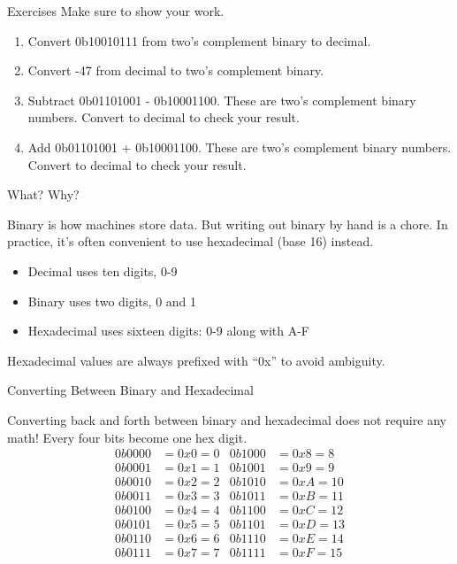 \begin{frame}{Exercises}
    Make sure to show your work.
    \begin{enumerate}
        \item Convert 0b10010111 from two's complement binary to decimal.
        \item Convert -47 from decimal to two's complement binary.
        \item Subtract 0b01101001 - 0b10001100. These are two's complement binary numbers.
              Convert to decimal to check your result.
        \item Add 0b01101001 + 0b10001100. These are two's complement binary numbers. Convert
              to decimal to check your result.
    \end{enumerate}
\end{frame}


\begin{frame}{What? Why?}

    Binary is how machines store data. But writing out binary by hand is a chore.
    In practice, it's often convenient to use hexadecimal (base 16) instead.

    \begin{itemize}
        \item Decimal uses ten digits, 0-9
        \item Binary uses two digits, 0 and 1
        \item Hexadecimal uses sixteen digits: 0-9 along with A-F
    \end{itemize}
    Hexadecimal values are always prefixed with ``0x'' to avoid ambiguity.
\end{frame}

\begin{frame}{Converting Between Binary and Hexadecimal}

    Converting back and forth between binary and hexadecimal does not require any
    math! Every four bits become one hex digit.
    \begin{align*}
        0b0000 & = 0x0 = 0 & 0b1000 & = 0x8 = 8  \\
        0b0001 & = 0x1 = 1 & 0b1001 & = 0x9 = 9  \\
        0b0010 & = 0x2 = 2 & 0b1010 & = 0xA = 10 \\
        0b0011 & = 0x3 = 3 & 0b1011 & = 0xB = 11 \\
        0b0100 & = 0x4 = 4 & 0b1100 & = 0xC = 12 \\
        0b0101 & = 0x5 = 5 & 0b1101 & = 0xD = 13 \\
        0b0110 & = 0x6 = 6 & 0b1110 & = 0xE = 14 \\
        0b0111 & = 0x7 = 7 & 0b1111 & = 0xF = 15 \\
    \end{align*}
\end{frame}

